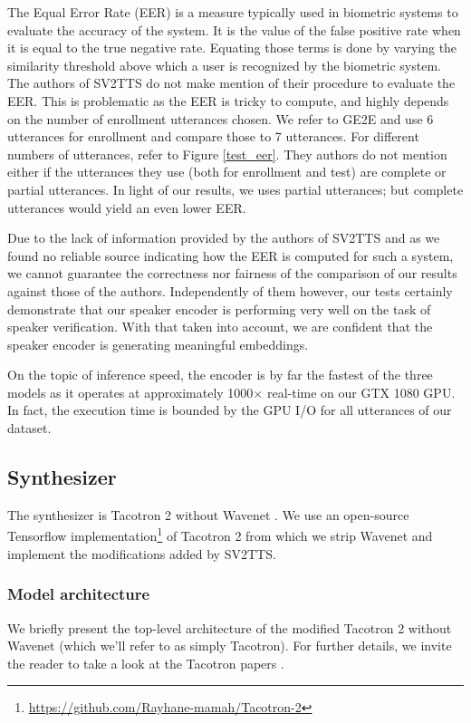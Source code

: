 \documentclass[a4paper, oneside, 12pt, english]{article}
\begin{document}
The Equal Error Rate (EER) is a measure typically used in biometric systems to evaluate the accuracy of the system. It is the value of the false positive rate when it is equal to the true negative rate. Equating those terms is done by varying the similarity threshold above which a user is recognized by the biometric system. The authors of SV2TTS do not make mention of their procedure to evaluate the EER. This is problematic as the EER is tricky to compute, and highly depends on the number of enrollment utterances chosen. We refer to GE2E and use 6 utterances for enrollment and compare those to 7 utterances. For different numbers of utterances, refer to Figure \ref{test_eer}. They authors do not mention either if the utterances they use (both for enrollment and test) are complete or partial utterances. In light of our results, we uses partial utterances; but complete utterances would yield an even lower EER.

Due to the lack of information provided by the authors of SV2TTS and as we found no reliable source indicating how the EER is computed for such a system, we cannot guarantee the correctness nor fairness of the comparison of our results against those of the authors. Independently of them however, our tests certainly demonstrate that our speaker encoder is performing very well on the task of speaker verification. With that taken into account, we are confident that the speaker encoder is generating meaningful embeddings.

On the topic of inference speed, the encoder is by far the fastest of the three models as it operates at approximately 1000$\times$ real-time on our GTX 1080 GPU. In fact, the execution time is bounded by the GPU I/O for all utterances of our dataset.

\subsection{Synthesizer} \label{synthesizer}
The synthesizer is Tacotron 2 without Wavenet \citep{WaveNet}. We use an open-source Tensorflow implementation\footnote{\url{https://github.com/Rayhane-mamah/Tacotron-2}} of Tacotron 2 from which we strip Wavenet and implement the modifications added by SV2TTS.

\subsubsection{Model architecture}
We briefly present the top-level architecture of the modified Tacotron 2 without Wavenet (which we'll refer to as simply Tacotron). For further details, we invite the reader to take a look at the Tacotron papers \citep{Tacotron2, Tacotron1}.
\end{document}
